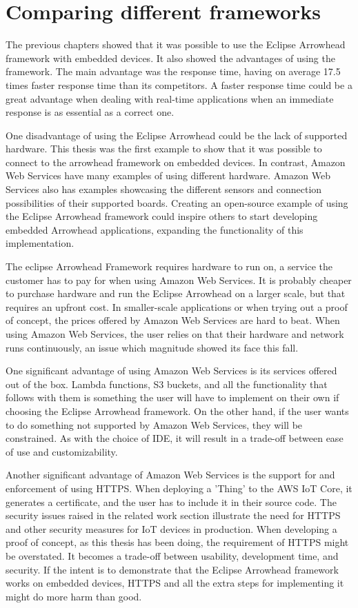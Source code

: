 \section{Comparing different frameworks}
The previous chapters showed that it was possible to use the Eclipse Arrowhead framework with embedded devices. It also showed the advantages of using the framework.
The main advantage was the response time, having on average 17.5 times faster response time than its competitors. 
A faster response time could be a great advantage when dealing with real-time applications when an immediate response is as essential as a correct one. 

One disadvantage of using the Eclipse Arrowhead could be the lack of supported hardware.
This thesis was the first example to show that it was possible to connect to the arrowhead framework on embedded devices.
In contrast, Amazon Web Services have many examples of using different hardware. 
Amazon Web Services also has examples showcasing the different sensors and connection possibilities of their supported boards.
Creating an open-source example of using the Eclipse Arrowhead framework could inspire others to start developing embedded Arrowhead applications, expanding the functionality of this implementation.

The eclipse Arrowhead Framework requires hardware to run on, a service the customer has to pay for when using Amazon Web Services. 
It is probably cheaper to purchase hardware and run the Eclipse Arrowhead on a larger scale, but that requires an upfront cost.
In smaller-scale applications or when trying out a proof of concept, the prices offered by Amazon Web Services are hard to beat.
When using Amazon Web Services, the user relies on that their hardware and network runs continuously, an issue which magnitude showed its face this fall. 

One significant advantage of using Amazon Web Services is its services offered out of the box.
Lambda functions, S3 buckets, and all the functionality that follows with them is something the user will have to implement on their own if choosing the Eclipse Arrowhead framework.
On the other hand, if the user wants to do something not supported by Amazon Web Services, they will be constrained.
As with the choice of IDE, it will result in a trade-off between ease of use and customizability.

Another significant advantage of Amazon Web Services is the support for and enforcement of using HTTPS.
When deploying a 'Thing' to the AWS IoT Core, it generates a certificate, and the user has to include it in their source code.
The security issues raised in the related work section illustrate the need for HTTPS and other security measures for IoT devices in production.
When developing a proof of concept, as this thesis has been doing, the requirement of HTTPS might be overstated.
It becomes a trade-off between usability, development time, and security. 
If the intent is to demonstrate that the Eclipse Arrowhead framework works on embedded devices, HTTPS and all the extra steps for implementing it might do more harm than good. 

